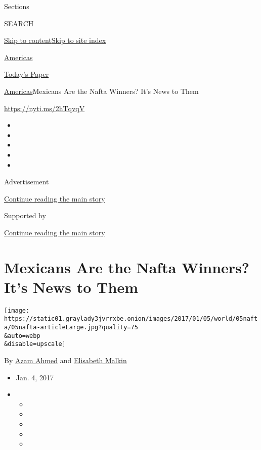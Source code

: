 Sections

SEARCH

\protect\hyperlink{site-content}{Skip to
content}\protect\hyperlink{site-index}{Skip to site index}

\href{https://www.nytimes3xbfgragh.onion/section/world/americas}{Americas}

\href{https://myaccount.nytimes3xbfgragh.onion/auth/login?response_type=cookie\&client_id=vi}{}

\href{https://www.nytimes3xbfgragh.onion/section/todayspaper}{Today's
Paper}

\href{/section/world/americas}{Americas}\textbar{}Mexicans Are the Nafta
Winners? It's News to Them

\url{https://nyti.ms/2hTqvqV}

\begin{itemize}
\item
\item
\item
\item
\item
\end{itemize}

Advertisement

\protect\hyperlink{after-top}{Continue reading the main story}

Supported by

\protect\hyperlink{after-sponsor}{Continue reading the main story}

\hypertarget{mexicans-are-the-nafta-winners-its-news-to-them}{%
\section{Mexicans Are the Nafta Winners? It's News to
Them}\label{mexicans-are-the-nafta-winners-its-news-to-them}}

\texttt{[image: https://static01.graylady3jvrrxbe.onion/images/2017/01/05/world/05nafta/05nafta-articleLarge.jpg?quality=75\\\&auto=webp\\\&disable=upscale]}

By \href{http://www.nytimes3xbfgragh.onion/by/azam-ahmed}{Azam Ahmed}
and
\href{https://www.nytimes3xbfgragh.onion/by/elisabeth-malkin}{Elisabeth
Malkin}

\begin{itemize}
\item
  Jan. 4, 2017
\item
  \begin{itemize}
  \item
  \item
  \item
  \item
  \item
  \end{itemize}
\end{itemize}


